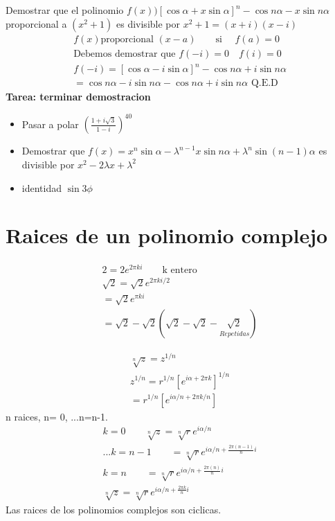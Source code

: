 \documentclass{article}
\newcommand{\caja}[3]{%
  \begin{tcolorbox}[colback=#1!5!white,colframe=#1!25!black,title=#2]
    #3
  \end{tcolorbox}%
}
\begin{document}
Demostrar que el polinomio $ f(x) ) [\cos{\alpha} +x \sin{\alpha} ] ^ {n }- \cos{n\alpha} -x \sin{n\alpha} $ proporcional a $ (x^2+1) $ es divisible por $ x^2+1 = (x+i)(x-i) $
\begin{gather}
  f(x) \text{proporcional } (x-a ) \qquad \text{si }\quad f(a) = 0   \\
  \text{Debemos demostrar que } f(-i)=0 \quad f(i)=0 \\
  f(-i) = [\cos{\alpha} - i \sin{\alpha}   ]^ {n }- \cos{n\alpha} + i \sin{n\alpha} \\
  = \cos{n\alpha} -i \sin{n\alpha} - \cos{n\alpha} +i \sin{n\alpha}\text{  Q.E.D}   
  \label{eq:demostracion_polinomio}
\end{gather}
\textbf{Tarea: terminar demostracion}

\caja{black}{Ejercicios}{
  \begin{itemize}
    \item Pasar a polar $ (\frac{1+i \sqrt{3}  }{1-i } ) ^ {40 } $
    \item Demostrar que $ f(x) = x^n \sin{\alpha} - \lambda ^ {n-1 }x \sin{n\alpha} + \lambda ^ {n } \sin{(n-1)\alpha}   $ es divisible por $ x^2-2\lambda x +\lambda^2 $
    \item identidad $ \sin{3\phi}   $
  \end{itemize}
}

\section{Raices de un polinomio complejo }
\begin{gather}
  2 = 2 e ^ {2\pi k i }\qquad \text{k entero }\\
  \sqrt{2 }  = \sqrt{2 } e ^ {2 \pi k i /2}\\
  = \sqrt{2 } e ^ {\pi k i }\\
  = \sqrt{2 } - \sqrt{2 } (\sqrt{2 } -\sqrt{2 } - \underset{Repetidas}{\sqrt{2}  }   )  
\end{gather}
\caja{green}{Raiz polinomio complejo }{
  \begin{gather}
    \sqrt[n]{z}  = z ^ {1/n}\\
    z ^ {1/n } = r ^ {1/n }[e ^ {i\alpha+2 \pi k }]^ {1/n }\\
    =r ^ {1/n }[e ^ {i\alpha/n+2 \pi k/n }]
    \label{eq:raiz_polinomio_complejo}
  \end{gather}
  n raices, n= 0, ...n=n-1.
  \begin{gather}
     k = 0 \qquad \sqrt[n]{z} = \sqrt[n]{r} e ^ {i \alpha/n }\\
     ... 
     k = n-1 \qquad = \sqrt[n]{r}e ^ {i \alpha/n +\frac{2\pi(n-1 )}{n}i }\\
    k = n \qquad = \sqrt[n]{r}e ^ {i \alpha/n +\frac{2\pi(n )}{n}i }\\
    \sqrt[n]{z} = \sqrt[n]{r}e ^ {i \alpha/n +\frac{2\pi k}{n}i }
  \end{gather}
  Las raices de los polinomios complejos son ciclicas.
}
\end{document}
